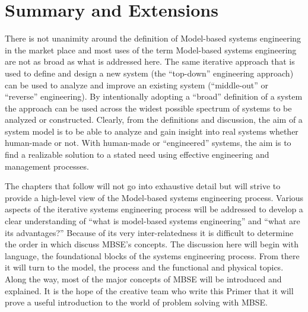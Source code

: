 \section{Summary and Extensions}

There is not unanimity around the definition of Model-based systems engineering in the market place and most uses of the term Model-based systems engineering are not as broad as what is addressed here. The same iterative approach that is used to define and design a new system (the ``top-down'' engineering approach) can be used to analyze and improve an existing system (``middle-out'' or ``reverse'' engineering). By intentionally adopting a ``broad'' definition of a system the approach can be used across the widest possible spectrum of systems to be analyzed or constructed. Clearly, from the definitions and discussion, the aim of a system model is to be able to analyze and gain insight into real systems whether human-made or not. With human-made or ``engineered'' systems, the aim is to find a realizable solution to a stated need using effective engineering and management processes.

The chapters that follow will not go into exhaustive detail but will strive to provide a high-level view of the Model-based systems engineering process. Various aspects of the iterative systems engineering process will be addressed to develop a clear understanding of ``what is model-based systems engineering'' and ``what are its advantages?'' Because of its very inter-relatedness it is difficult to determine the order in which discuss MBSE’s concepts. The discussion here will begin with language, the foundational blocks of the systems engineering process. From there it will turn to the model, the process and the functional and physical topics. Along the way, most of the major concepts of MBSE will be introduced and explained. It is the hope of the creative team who write this Primer that it will prove a useful introduction to the world of problem solving with MBSE.


